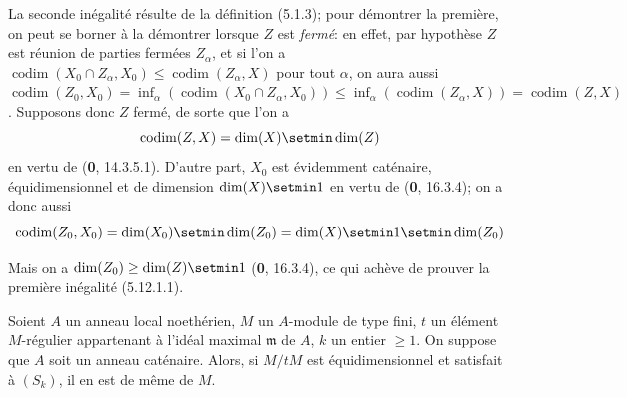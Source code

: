 La seconde inégalité résulte de la définition (5.1.3); pour démontrer la
première, on peut se borner à la démontrer lorsque $Z$ est \emph{fermé}: en effet, par
hypothèse $Z$ est réunion de parties fermées $Z_\alpha$, et si l'on a
$\operatorname{codim}(X_0\cap Z_\alpha,X_0)
\leq\operatorname{codim}(Z_\alpha,X)$ pour tout $\alpha$, on aura aussi
$\operatorname{codim}(Z_0,X_0)
=\inf_\alpha(\operatorname{codim}(X_0\cap Z_\alpha,X_0))
\leq\inf_\alpha(\operatorname{codim}(Z_\alpha,X))
=\operatorname{codim}(Z,X)$.
Supposons donc $Z$ fermé, de sorte que l'on a
\[
\operatorname{codim}(Z,X)=\dim(X)\setmin\dim(Z)
\]
en vertu de (\textbf{0}, 14.3.5.1). D'autre part, $X_0$ est évidemment caténaire,
équidimensionnel et de dimension $\dim(X)\setmin 1$ en vertu de (\textbf{0}, 16.3.4); on a
donc aussi
\[
\operatorname{codim}(Z_0,X_0)=\dim(X_0)\setmin\dim(Z_0)
=\dim(X)\setmin 1\setmin\dim(Z_0)
\]

Mais on a $\dim(Z_0)\geq\dim(Z)\setmin 1$ (\textbf{0}, 16.3.4), ce qui achève de prouver la
première inégalité (5.12.1.1).

\begin{proposition}[5.12.2]
\label{IV.2.s5.12.2-fr}
Soient $A$ un anneau local noethérien, $M$ un $A$-module de type fini, $t$ un
élément $M$-régulier appartenant à l'idéal maximal $\mathfrak m$ de $A$, $k$
un entier $\geq1$. On suppose que $A$ soit un anneau caténaire. Alors, si
$M/tM$ est équidimensionnel et satisfait à $(S_k)$, il en est de même de $M$.
\end{proposition}

